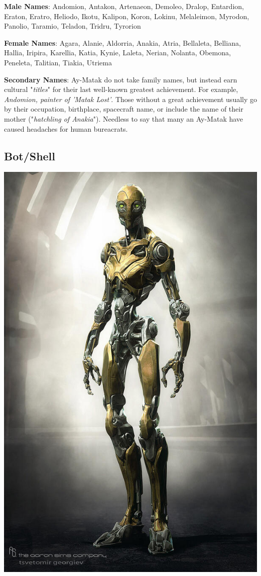 \documentclass[10pt,twoside]{article}
\begin{document}
\begin{multicols}{2}
  \textbf{Male Names}: Andomion, Antakon, Artenaeon, Demoleo, Dralop, Entardion, Eraton, Eratro, Heliodo, Ikotu, Kalipon, Koron, Lokinu, Melaleimon, Myrodon, Panolio, Taramio, Teladon, Tridru, Tyrorion
  
  \textbf{Female Names}: Agara, Alanie, Aldorria, Anakia, Atria, Bellaleta, Belliana, Hallia, Iripira, Karellia, Katia, Kynie, Laleta, Nerian, Nolanta, Obemona, Peneleta, Talitian, Tiakia, Utriema
  
  \textbf{Secondary Names}: Ay-Matak do not take family names, but instead earn cultural "\textit{titles}" for their last well-known greatest achievement. For example, \textit{Andomion, painter of 'Matak Lost'}. Those without a great achievement usually go by their occupation, birthplace, spacecraft name, or include the name of their mother ("\textit{hatchling of Anakia}"). Needless to say that many an Ay-Matak have caused headaches for human bureacrats.
  
  \columnbreak

  \subsection{Bot/Shell}
  
  \includegraphics[width=\linewidth]{BEzZuPdCEAAgcr8}


\end{multicols}
\end{document}
